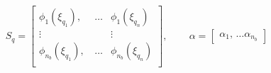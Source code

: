\documentclass[10pt]{article}
\begin{document}
    \begin{align}
    S_q = 
    \begin{bmatrix}
      \phi_1(\xi_{q_1}),\, &\ldots &\phi_1(\xi_{q_n}) \\
      \vdots && \vdots \\
      \phi_{n_b}(\xi_{q_1}),\,  &\ldots &\phi_{n_b}(\xi_{q_n}) \\
    \end{bmatrix},\, \qquad
    \alpha = \begin{bmatrix} \alpha_1,\, \ldots \alpha_{n_b}\end{bmatrix}
    \end{align}


\nocite{*}
{
  }
\end{document}
